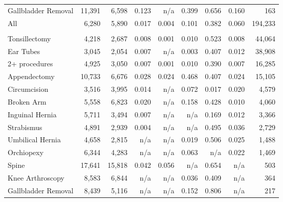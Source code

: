 \begin{table}[H]
\begin{tabular}{lrrrrrrrr}
\hspace{1em}Gallbladder Removal & 11,391 & 6,598 & 0.123 & n/a & 0.399 & 0.656 & 0.160 & 163\\
\hspace{1em}All & 6,280 & 5,890 & 0.017 & 0.004 & 0.101 & 0.382 & 0.060 & 194,233\\
\addlinespace[0.3em]
\multicolumn{9}{l}{\textbf{Non-Children's Hospitals}}\\
\hspace{1em}Tonsillectomy & 4,218 & 2,687 & 0.008 & 0.001 & 0.010 & 0.523 & 0.008 & 44,064\\
\hspace{1em}Ear Tubes & 3,045 & 2,054 & 0.007 & n/a & 0.003 & 0.407 & 0.012 & 38,908\\
\hspace{1em}2+ procedures & 4,925 & 3,050 & 0.007 & 0.001 & 0.010 & 0.390 & 0.007 & 16,285\\
\hspace{1em}Appendectomy & 10,733 & 6,676 & 0.028 & 0.024 & 0.468 & 0.407 & 0.024 & 15,105\\
\hspace{1em}Circumcision & 3,516 & 3,995 & 0.014 & n/a & 0.072 & 0.017 & 0.020 & 4,579\\
\hspace{1em}Broken Arm & 5,558 & 6,823 & 0.020 & n/a & 0.158 & 0.428 & 0.010 & 4,060\\
\hspace{1em}Inguinal Hernia & 5,711 & 3,494 & 0.007 & n/a & n/a & 0.169 & 0.012 & 3,366\\
\hspace{1em}Strabismus & 4,891 & 2,939 & 0.004 & n/a & n/a & 0.495 & 0.036 & 2,729\\
\hspace{1em}Umbilical Hernia & 4,658 & 2,815 & n/a & n/a & 0.019 & 0.506 & 0.025 & 1,488\\
\hspace{1em}Orchiopexy & 6,344 & 4,283 & n/a & n/a & 0.063 & n/a & 0.022 & 1,469\\
\hspace{1em}Spine & 17,641 & 15,818 & 0.042 & 0.056 & n/a & 0.654 & n/a & 503\\
\hspace{1em}Knee Arthroscopy & 8,583 & 6,844 & n/a & n/a & 0.036 & 0.409 & n/a & 364\\
\hspace{1em}Gallbladder Removal & 8,439 & 5,116 & n/a & n/a & 0.152 & 0.806 & n/a & 217\\

\end{tabular}
\end{table}
